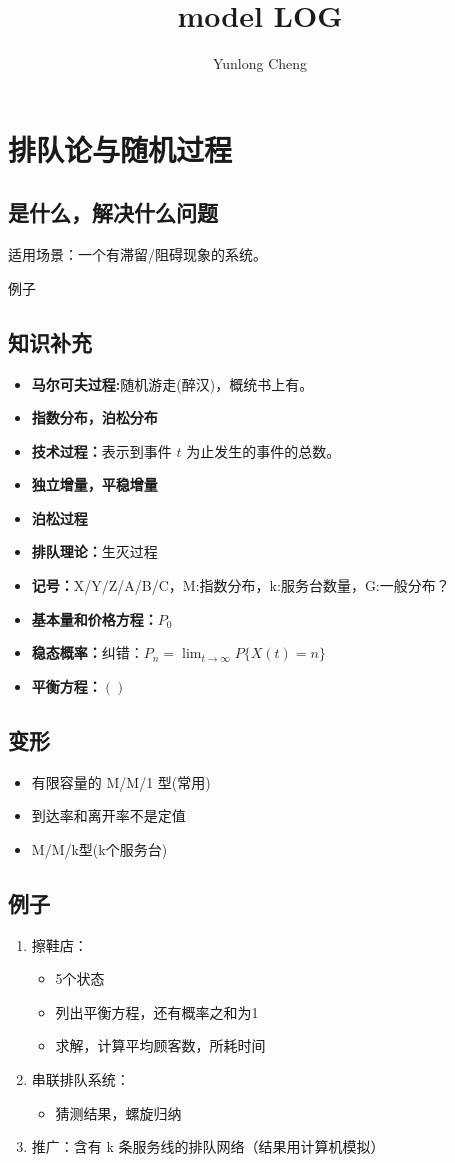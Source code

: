 \documentclass[12pt,a4paper]{article}
\title{model LOG}
\author{Yunlong Cheng}
\begin{document}
\maketitle
\section{排队论与随机过程}
\subsection{是什么，解决什么问题}
适用场景：一个有滞留/阻碍现象的系统。

例子
\subsection{知识补充}
\begin{itemize}
  \item \textbf{马尔可夫过程:}随机游走(醉汉)，概统书上有。
  \item \textbf{指数分布，泊松分布}
  \item \textbf{技术过程：}表示到事件 $t$ 为止发生的事件的总数。
  \item \textbf{独立增量，平稳增量}
  \item \textbf{泊松过程}
  \item \textbf{排队理论：}生灭过程
  \item \textbf{记号：}X/Y/Z/A/B/C，M:指数分布，k:服务台数量，G:一般分布？
  \item \textbf{基本量和价格方程：}$P_0$
  \item \textbf{稳态概率：}纠错：$P_n = \lim_{t \to \infty}P\{X(t) = n\}$
  \item \textbf{平衡方程：}$()$
\end{itemize}
\subsection{变形}
\begin{itemize}
  \item 有限容量的 M/M/1 型(常用)
  \item 到达率和离开率不是定值
  \item M/M/k型(k个服务台)
\end{itemize}
\subsection{例子}
\begin{enumerate}
  \item 擦鞋店：
  \begin{itemize}
    \item 5个状态
    \item 列出平衡方程，还有概率之和为1
    \item 求解，计算平均顾客数，所耗时间
  \end{itemize}
  \item 串联排队系统：
  \begin{itemize}
    \item 猜测结果，螺旋归纳
  \end{itemize}
  \item 推广：含有 k 条服务线的排队网络（结果用计算机模拟）
\end{enumerate}
\end{document}
